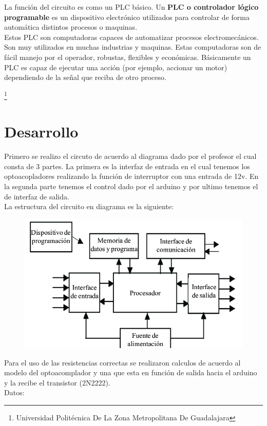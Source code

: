 \documentclass[11pt,a4paper]{article}
\begin{document}
La función del circuito es como un PLC básico. Un \textbf{PLC o controlador lógico programable} es un dispositivo electrónico utilizados para controlar de forma automática distintos procesos o maquinas.\\
Estos PLC son computadoras capaces de automatizar procesos electromecánicos. Son muy utilizados en muchas industrias y maquinas. Estas computadoras son de fácil manejo por el operador, robustas, flexibles y económicas. Básicamente un PLC es capaz de ejecutar una acción (por ejemplo, accionar un motor) dependiendo de la señal que reciba de otro proceso.


\footnote{Universidad Politécnica De La Zona Metropolitana De Guadalajara} 
\newpage

\section{Desarrollo}

Primero se realizo el circuto de acuerdo al diagrama dado por el profesor el cual consta de 3 partes. La primera es la interfaz de entrada en el cual tenemos los optoacopladores realizando la función de interruptor con una entrada de 12v. En la segunda parte tenemos el control dado por el arduino y por ultimo tenemos el de interfaz de salida.\\

La estructura del circuito en diagrama es la siguiente:\\

\begin{figure}[hbtp]
\centering
\includegraphics[scale=0.60]{estructura.png} 
\end{figure}

Para el uso de las resistencias correctas se realizaron calculos de acuerdo al modelo del optoacomplador y una que esta en función de salida hacia el arduino y la recibe el transistor (2N2222).\\
Datos:\\
\end{document}

